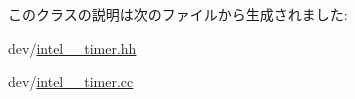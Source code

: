 \label{classIntel8254Timer_a08675539c603a90a51229153d9503881}
\hypertarget{classIntel8254Timer_a299de4c1b75292c5dbcdf22a59e6c455}{
\subsubsection[{sel}]{}}
\label{classIntel8254Timer_a299de4c1b75292c5dbcdf22a59e6c455}


このクラスの説明は次のファイルから生成されました:\begin{DoxyCompactItemize}
\item 
dev/\hyperlink{intel__8254__timer_8hh}{intel\_\_\-timer.hh}\item 
dev/\hyperlink{intel__8254__timer_8cc}{intel\_\_\-timer.cc}\end{DoxyCompactItemize}
